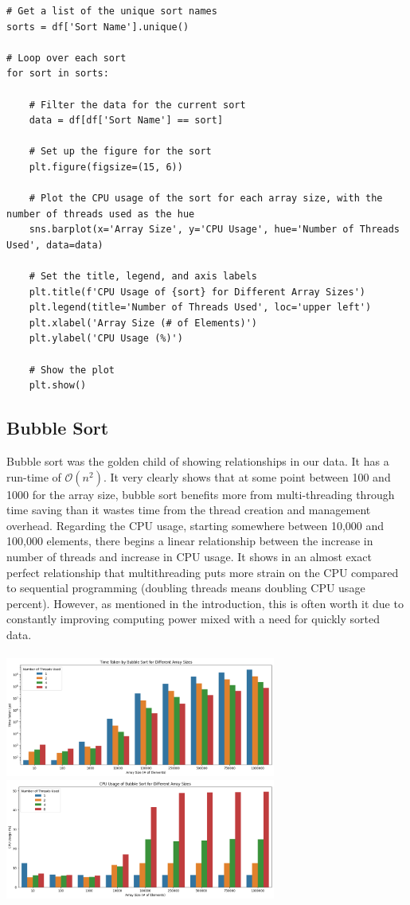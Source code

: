 \documentclass[conference]{IEEEtran}
\begin{document}
\begin{lstlisting}
# Get a list of the unique sort names
sorts = df['Sort Name'].unique()

# Loop over each sort
for sort in sorts:
    
    # Filter the data for the current sort
    data = df[df['Sort Name'] == sort]

    # Set up the figure for the sort
    plt.figure(figsize=(15, 6))

    # Plot the CPU usage of the sort for each array size, with the number of threads used as the hue
    sns.barplot(x='Array Size', y='CPU Usage', hue='Number of Threads Used', data=data)

    # Set the title, legend, and axis labels
    plt.title(f'CPU Usage of {sort} for Different Array Sizes')
    plt.legend(title='Number of Threads Used', loc='upper left')
    plt.xlabel('Array Size (# of Elements)')
    plt.ylabel('CPU Usage (%)')

    # Show the plot
    plt.show()
\end{lstlisting}

\subsection{Bubble Sort}
Bubble sort was the golden child of showing relationships in our data. It has a run-time of $\mathcal{O}(n^2)$. It very clearly shows that at some point between 100 and 1000 for the array size, bubble sort benefits more from multi-threading through time saving than it wastes time from the thread creation and management overhead.
Regarding the CPU usage, starting somewhere between 10,000 and 100,000 elements, there begins a linear relationship between the increase in number of threads and increase in CPU usage. It shows in an almost exact perfect relationship that multithreading puts more strain on the CPU compared to sequential programming (doubling threads means doubling CPU usage percent). However, as mentioned in the introduction, this is often worth it due to constantly improving computing power mixed with a need for quickly sorted data.
\\\\
\includegraphics[width=3.5in]{BubbleSortTimeTaken.png}
\includegraphics[width=3.5in]{BubbleSortCPUUsage.png}
\end{document}
